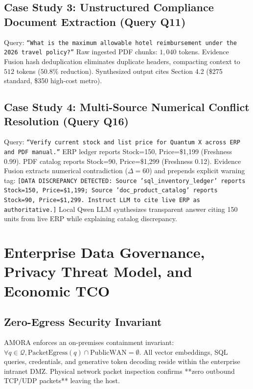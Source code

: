 \documentclass[journal,10pt,twocolumn]{IEEEtran}
\begin{document}
\subsection{Case Study 3: Unstructured Compliance Document Extraction (Query Q11)}
Query: \texttt{``What is the maximum allowable hotel reimbursement under the 2026 travel policy?''}  
Raw ingested PDF chunks: $1,040$ tokens. Evidence Fusion hash deduplication eliminates duplicate headers, compacting context to $512$ tokens ($50.8\%$ reduction). Synthesized output cites Section 4.2 (\$275 standard, \$350 high-cost metro).

\subsection{Case Study 4: Multi-Source Numerical Conflict Resolution (Query Q16)}
Query: \texttt{``Verify current stock and list price for Quantum X across ERP and PDF manual.''}  
ERP ledger reports Stock=150, Price=\$1,199 (Freshness 0.99). PDF catalog reports Stock=90, Price=\$1,299 (Freshness 0.12). Evidence Fusion extracts numerical contradiction ($\Delta = 60$) and prepends explicit warning tag: \texttt{[DATA DISCREPANCY DETECTED: Source 'sql\_inventory\_ledger' reports Stock=150, Price=\$1,199; Source 'doc\_product\_catalog' reports Stock=90, Price=\$1,299. Instruct LLM to cite live ERP as authoritative.]} Local Qwen LLM synthesizes transparent answer citing 150 units from live ERP while explaining catalog discrepancy.

\section{Enterprise Data Governance, Privacy Threat Model, and Economic TCO}
\label{sec:enterprise_governance}

\subsection{Zero-Egress Security Invariant}
AMORA enforces an on-premises containment invariant: $\forall q \in \mathcal{Q}, \text{PacketEgress}(q) \cap \text{PublicWAN} = \emptyset$. All vector embeddings, SQL queries, credentials, and generative token decoding reside within the enterprise intranet DMZ. Physical network packet inspection confirms **zero outbound TCP/UDP packets** leaving the host.
\end{document}
